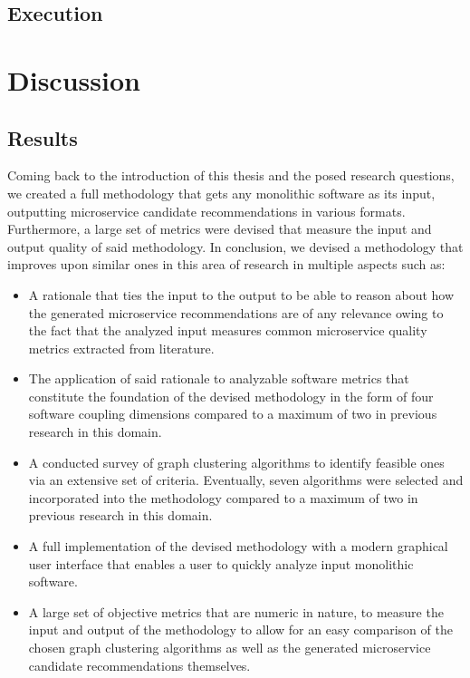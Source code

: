 \documentclass[12pt,a4paper]{report}
\begin{document}
\section{Execution} \label{sect:experiment-execution}






\chapter{Discussion} \label{chap:discussion}

\section{Results}

Coming back to the introduction of this thesis and the posed research questions,
we created a full methodology that gets any monolithic software as its input,
outputting microservice candidate recommendations in various formats.
Furthermore, a large set of metrics were devised that measure the input and
output quality of said methodology.
In conclusion, we devised a methodology that improves upon similar ones in
this area of research in multiple aspects such as:

\begin{itemize}
    \item A rationale that ties the input to the output to be able to reason
    about how the generated microservice recommendations are of any relevance
    owing to the fact that the analyzed input measures common microservice
    quality metrics extracted from literature.
    \item The application of said rationale to analyzable software metrics
    that constitute the foundation of the devised methodology in the form
    of four software coupling dimensions compared to a maximum
    of two in previous research in this domain.
    \item A conducted survey of graph clustering algorithms to identify feasible
    ones via an extensive set of criteria. Eventually, seven algorithms were
    selected and incorporated into the methodology compared to a maximum
    of two in previous research in this domain.
    \item A full implementation of the devised methodology with a modern
    graphical user interface that enables a user to quickly analyze input
    monolithic software.
    \item A large set of objective metrics that are numeric in nature,
    to measure the input and output of the methodology to allow for an
    easy comparison of the chosen graph clustering algorithms as well as
    the generated microservice candidate recommendations themselves.
\end{itemize}
\end{document}
